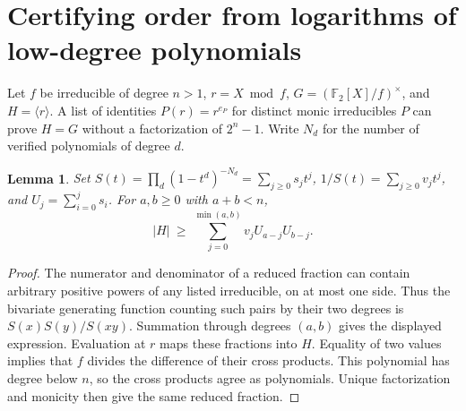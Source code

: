 \documentclass[11pt]{article}
\newtheorem{lemma}[theorem]{Lemma}
\newcommand{\F}{\mathbb F_2}
\begin{document}
\section{Certifying order from logarithms of low-degree polynomials}\label{sec:factor-base}

Let \(f\) be irreducible of degree \(n>1\), \(r=X\bmod f\),
\(G=(\F[X]/f)^\times\), and \(H=\langle r\rangle\). A list of
identities \(P(r)=r^{e_P}\) for distinct monic irreducibles \(P\)
can prove \(H=G\) without a factorization of \(2^n-1\).
Write \(N_d\) for the number of verified polynomials of degree \(d\).

\begin{lemma}\label{lem:smooth-ratios}
Set \(S(t)=\prod_d(1-t^d)^{-N_d}=\sum_{j\ge0}s_jt^j\),
\(1/S(t)=\sum_{j\ge0}v_jt^j\), and \(U_j=\sum_{i=0}^j s_i\).
For \(a,b\ge0\) with \(a+b<n\),
\[
             |H|\ \ge\ \sum_{j=0}^{\min(a,b)}v_j U_{a-j}U_{b-j}.
\]
\end{lemma}
\begin{proof}
The numerator and denominator of a reduced fraction can contain
arbitrary positive powers of any listed irreducible, on at most one
side. Thus the bivariate generating function counting such pairs by
their two degrees is \(S(x)S(y)/S(xy)\). Summation through degrees
\((a,b)\) gives the displayed expression. Evaluation at \(r\) maps
these fractions into \(H\). Equality of two values implies that \(f\)
divides the difference of their cross products. This polynomial has
degree below \(n\), so the cross products agree as polynomials. Unique
factorization and monicity then give the same reduced fraction.
\end{proof}
\end{document}
